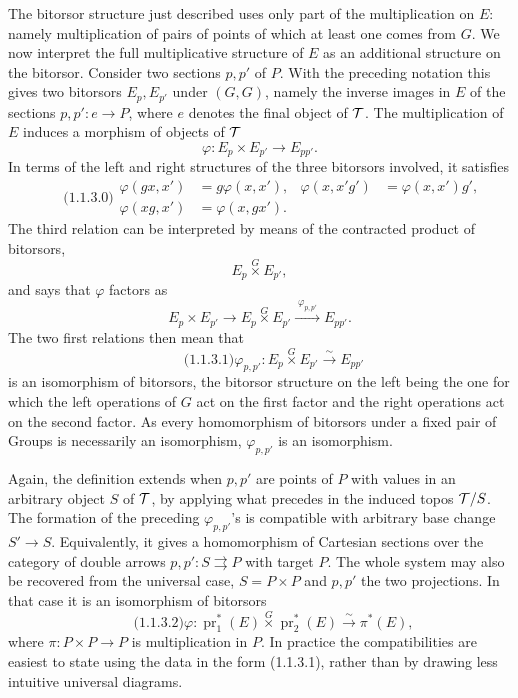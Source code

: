 \documentclass[11pt]{article}
\providecommand{\pr}{\operatorname{pr}}
\begin{document}
The bitorsor structure just described uses only part of the multiplication on \(E\): namely multiplication of pairs of points of which at least one comes from \(G\).  We now interpret the full multiplicative structure of \(E\) as an additional structure on the bitorsor.  Consider two sections \(p,p'\) of \(P\).  With the preceding notation this gives two bitorsors \(E_p,E_{p'}\) under \((G,G)\), namely the inverse images in \(E\) of the sections \(p,p':e\to P\), where \(e\) denotes the final object of \(\mathcal T\).  The multiplication of \(E\) induces a morphism of objects of \(\mathcal T\)
\[
  \varphi:E_p\times E_{p'}\longrightarrow E_{pp'}.
\]
In terms of the left and right structures of the three bitorsors involved, it satisfies
\begin{equation}\qquad\text{(1.1.3.0)}
\begin{aligned}
 \varphi(gx,x')&=g\varphi(x,x'),&
 \varphi(x,x'g')&=\varphi(x,x')g',\\
 \varphi(xg,x')&=\varphi(x,gx').
\end{aligned}
\end{equation}
The third relation can be interpreted by means of the contracted product of bitorsors,
\[
  E_p\overset{G}{\times}E_{p'},
\]
and says that \(\varphi\) factors as
\[
  E_p\times E_{p'}\longrightarrow
  E_p\overset{G}{\times}E_{p'}
  \xrightarrow{\;\varphi_{p,p'}\;}E_{pp'}.
\]
The two first relations then mean that
\begin{equation}\qquad\text{(1.1.3.1)}
  \varphi_{p,p'}:E_p\overset{G}{\times}E_{p'}\xrightarrow{\sim}E_{pp'}
\end{equation}
is an isomorphism of bitorsors, the bitorsor structure on the left being the one for which the left operations of \(G\) act on the first factor and the right operations act on the second factor.  As every homomorphism of bitorsors under a fixed pair of Groups is necessarily an isomorphism, \(\varphi_{p,p'}\) is an isomorphism.

Again, the definition extends when \(p,p'\) are points of \(P\) with values in an arbitrary object \(S\) of \(\mathcal T\), by applying what precedes in the induced topos \(\mathcal T/S\).  The formation of the preceding \(\varphi_{p,p'}\)'s is compatible with arbitrary base change \(S'\to S\).  Equivalently, it gives a homomorphism of Cartesian sections over the category of double arrows \(p,p':S\rightrightarrows P\) with target \(P\).  The whole system may also be recovered from the universal case, \(S=P\times P\) and \(p,p'\) the two projections.  In that case it is an isomorphism of bitorsors
\begin{equation}\qquad\text{(1.1.3.2)}
  \varphi:\pr_1^*(E)\overset{G}{\times}\pr_2^*(E)
     \xrightarrow{\sim}\pi^*(E),
\end{equation}
where \(\pi:P\times P\to P\) is multiplication in \(P\).  In practice the compatibilities are easiest to state using the data in the form (1.1.3.1), rather than by drawing less intuitive universal diagrams.
\end{document}
